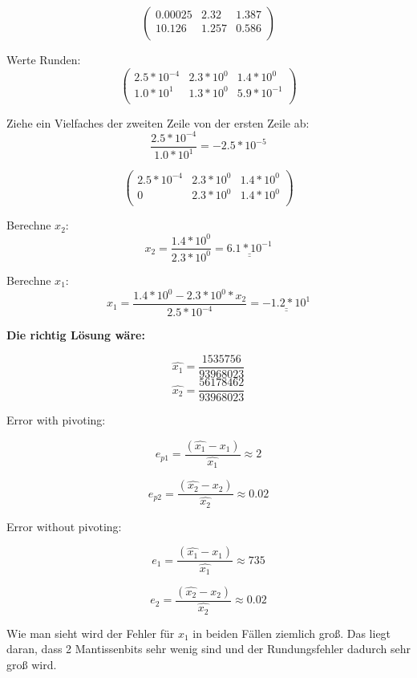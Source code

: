 \documentclass{article}
\newcommand{\dblunderline}[1]{\underline{\underline{#1}}}
\begin{document}
\[
    \left(
    \begin{array}{cc|c}
        0.00025 & 2.32 & 1.387 \\
        10.126 & 1.257 & 0.586 \\
    \end{array}
    \right)
\]

Werte Runden:
\[
    \left(
    \begin{array}{cc|c}
        2.5*10^{-4} & 2.3*10^0 & 1.4*10^0 \\
        1.0*10^1 & 1.3*10^0 & 5.9*10^{-1} \\
    \end{array}
    \right)
\]

Ziehe ein Vielfaches der zweiten Zeile von der ersten Zeile ab:
\[
    \frac{2.5*10^{-4}}{1.0*10^1} = -2.5*10^{-5}
\]

\[
    \left(
    \begin{array}{cc|c}
        2.5*10^{-4} & 2.3*10^0 & 1.4*10^0 \\
        0 & 2.3*10^0 & 1.4*10^0 \\
    \end{array}
    \right)
\]

Berechne \(x_2\):
\[
    x_2 = \frac{1.4*10^0}{2.3*10^0} = \dblunderline{6.1*10^{-1}}
\]

Berechne \(x_1\):
\[
    x_1 = \frac{1.4*10^0 - 2.3*10^0*x_2}{2.5*10^{-4}} =  \dblunderline{-1.2*10^1}
\]


\textbf{Die richtig Lösung wäre:}
\begin{multicols}{2}
    \[\hat{x_1} = \frac{1535756}{93968023}\]
    \break
    \[\hat{x_2} = \frac{56178462}{93968023}\]
\end{multicols}

Error with pivoting:

\[
    e_{p1} = \frac{\left(\hat{x_1} - x_1\right)}{\hat{x_1}} \approx 2
\]

\[
    e_{p2} = \frac{\left(\hat{x_2} - x_2\right)}{\hat{x_2}} \approx 0.02
\]


Error without pivoting:

\[
    e_1 = \frac{\left(\hat{x_1} - x_1\right)}{\hat{x_1}} \approx 735
\]

\[
    e_2 = \frac{\left(\hat{x_2} - x_2\right)}{\hat{x_2}} \approx 0.02
\]

Wie man sieht wird der Fehler für \(x_1\) in beiden Fällen ziemlich groß.
Das liegt daran, dass 2 Mantissenbits sehr wenig sind und der Rundungsfehler dadurch sehr groß wird.
\end{document}
